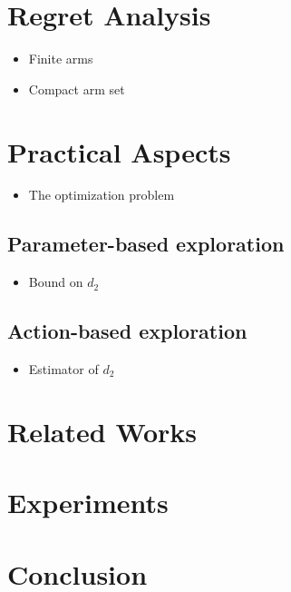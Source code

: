 \documentclass{article}
\begin{document}
\section{Regret Analysis}
\begin{itemize}
	\item Finite arms
	\item Compact arm set
\end{itemize}

\section{Practical Aspects}
\begin{itemize}
	\item The optimization problem
\end{itemize}
\subsection{Parameter-based exploration}
\begin{itemize}
	\item Bound on $d_2$
\end{itemize}
\subsection{Action-based exploration}
\begin{itemize}
	\item Estimator of $d_2$
\end{itemize}

\section{Related Works}

\section{Experiments}

\section{Conclusion}

%
%
\end{document}
